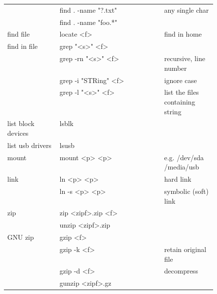 {\begin{tabularx}{\linewidth}{@{} p{0.25\linewidth}>{\ttfamily}lp{0.25\linewidth} @{}}
                             & find . -name "?.txt"       & any single char                  \\
                             & find . -name "foo.*"       &                                  \\
        find file            & locate <f>                 & find in home                     \\
        find in file         & grep "<s>" <f>             &                                  \\
                             & grep -rn "<s>" <f>         & recursive, line number           \\
                             & grep -i "STRing" <f>       & ignore case                      \\
                             & grep -l "<s>" <f>          & list the files containing string \\
        list block devices   & lsblk                      &                                  \\
        list usb drivers     & lsusb                      &                                  \\
        mount                & mount <p> <p>              & e.g. /dev/sda /media/usb         \\
        link                 & ln <p> <p>                 & hard link                        \\
                             & ln -s <p> <p>              & symbolic (soft) link             \\
        zip                  & zip <zipf>.zip <f>         &                                  \\
                             & unzip <zipf>.zip           &                                  \\
        GNU zip              & gzip <f>                   &                                  \\
                             & gzip -k <f>                & retain original file             \\
                             & gzip -d <f>                & decompress                       \\
                             & gunzip <zipf>.gz           &                                  \\
    \end{tabularx}
    \begin{tabularx}{\linewidth}{@{} p{0.25\linewidth}>{\ttfamily}lp{0.25\linewidth} @{}}

\end{tabularx}}

